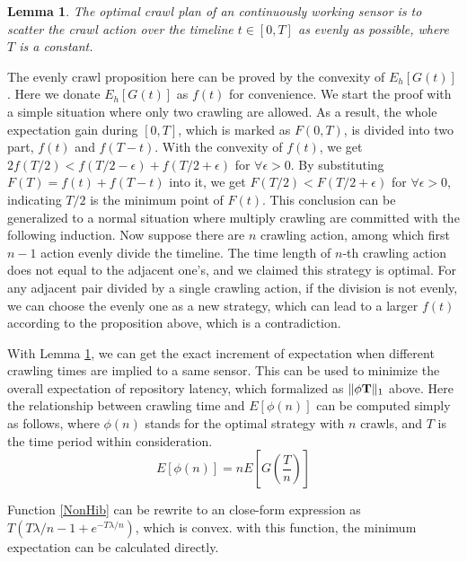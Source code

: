 \documentclass[conference]{IEEEtran}
\newtheorem{lemma}{Lemma}
\begin{document}
\begin{lemma}
\label{evenly}
The optimal crawl plan of an continuously working sensor is to scatter the crawl action over the timeline $t\in [0, T]$ as evenly as possible, where $T$ is a constant.
\end{lemma}
\begin{IEEEproof}
The evenly crawl proposition here can be proved by the convexity of $E_h[G(t)]$ \cite{boyd2004convex}. Here we donate $E_h[G(t)]$ as $f(t)$ for convenience. 
We start the proof with a simple situation where only two crawling are allowed. 
As a result, the whole expectation gain during $[0,T]$, which is marked as $F(0, T)$, is divided into two part, $f(t)$ and $f(T-t)$. With the convexity of $f(t)$, we get $2f(T/2)<f(T/2-\epsilon)+f(T/2+\epsilon)$ for $\forall{\epsilon>0}$. By substituting $F(T)=f(t)+f(T-t)$ into it, we get $F(T/2)<F(T/2+\epsilon)$ for $\forall{\epsilon>0}$, indicating $T/2$ is the minimum point of $F(t)$.
This conclusion can be generalized to a normal situation where multiply crawling are committed with the following induction. 
Now suppose there are $n$ crawling action, among which first $n-1$ action evenly divide the timeline. The time length of $n$-th crawling action does not equal to the adjacent one's, and we claimed this strategy is optimal. For any adjacent pair divided by a single crawling action, if the division is not evenly, we can choose the evenly one as a new strategy, which can lead to a larger $f(t)$ according to the proposition above, which is a contradiction.
\end{IEEEproof}

With Lemma \ref{evenly}, we can get the exact increment of expectation when different crawling times are implied to a same sensor. This can be used to minimize the overall expectation of repository latency, which formalized as $\Arrowvert \phi\mathbf{T} \Arrowvert_{1}$ above.
Here the relationship between crawling time and $E[\phi(n)]$ can be computed simply as follows, where $\phi(n)$ stands for the optimal strategy with $n$ crawls, and $T$ is the time period within consideration. 
\begin{equation}
E[\phi(n)]=nE[G(\frac{T}{n})]\label{NonHib}
\end{equation}

Function \eqref{NonHib} can be rewrite to an close-form expression as $T(T\lambda/n-1+e^{-T\lambda/n})$, which is convex. with this function, the minimum expectation can be calculated directly.
\end{document}
